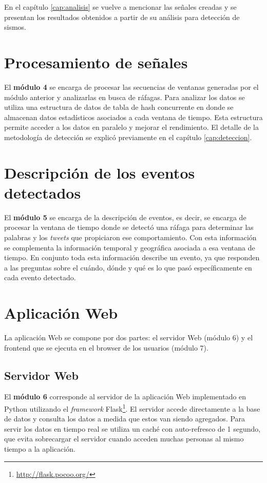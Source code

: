 En el capítulo \ref{cap:analisis} se vuelve a mencionar las señales creadas y se presentan los resultados obtenidos a partir de su análisis para detección de sismos.

\section{Procesamiento de señales}

El \textbf{módulo 4} se encarga de procesar las secuencias de ventanas generadas por el módulo anterior y analizarlas en busca de ráfagas.  
%
Para analizar los datos se utiliza una estructura de datos de tabla de hash concurrente en donde se almacenan datos estadísticos asociados a cada ventana de tiempo. Esta estructura permite acceder a los datos en paralelo y mejorar el rendimiento.
%
El detalle de la metodología de detección se explicó previamente en el capítulo \ref{cap:deteccion}.

\section{Descripción de los eventos detectados}

El \textbf{módulo 5} se encarga de la descripción de eventos, es decir, se encarga de procesar la ventana de tiempo donde se detectó una ráfaga para determinar las palabras y los \textit{tweets} que propiciaron ese comportamiento.
%
Con esta información se complementa la información temporal y geográfica asociada a esa ventana de tiempo.
%
En conjunto toda esta información describe un evento, ya que responden a las preguntas sobre el cuándo, dónde y qué es lo que pasó específicamente en cada evento detectado.


\section{Aplicación Web}

La aplicación Web se compone por dos partes: el servidor Web (módulo 6) y el frontend que se ejecuta en el browser de los usuarios (módulo 7). 

\subsection{Servidor Web}
El \textbf{módulo 6} corresponde al servidor de la aplicación Web implementado en Python utilizando el \textit{framework} Flask\footnote{\url{http://flask.pocoo.org/}}. El servidor accede directamente a la base de datos y consulta los datos a medida que estos van siendo agregados. Para servir los datos en tiempo real se utiliza un caché con auto-refresco de 1 segundo, que evita sobrecargar el servidor cuando acceden muchas personas al mismo tiempo a la aplicación. 

